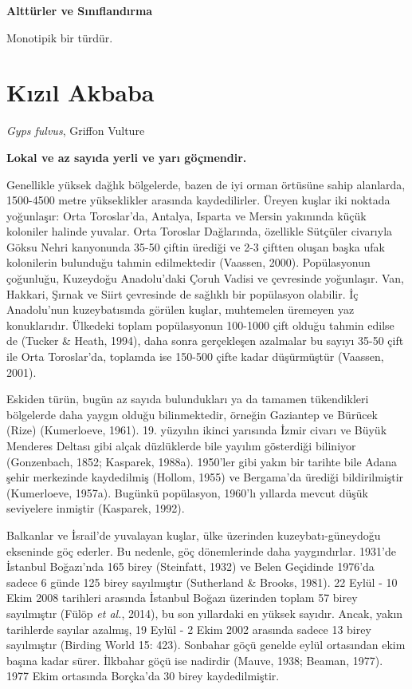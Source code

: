 \documentclass[
  a4paper,
  DIV=11,
  numbers=noendperiod]{scrreprt}
\begin{document}
\textbf{Alttürler ve Sınıflandırma}

Monotipik bir türdür.

\section{Kızıl Akbaba}\label{kux131zux131l-akbaba}

\emph{Gyps fulvus}, Griffon Vulture

\textbf{Lokal ve az sayıda yerli ve yarı göçmendir.}

Genellikle yüksek dağlık bölgelerde, bazen de iyi orman örtüsüne sahip
alanlarda, 1500-4500 metre yükseklikler arasında kaydedilirler. Üreyen
kuşlar iki noktada yoğunlaşır: Orta Toroslar'da, Antalya, Isparta ve
Mersin yakınında küçük koloniler halinde yuvalar. Orta Toroslar
Dağlarında, özellikle Sütçüler civarıyla Göksu Nehri kanyonunda 35-50
çiftin ürediği ve 2-3 çiftten oluşan başka ufak kolonilerin bulunduğu
tahmin edilmektedir (Vaassen, 2000). Popülasyonun çoğunluğu, Kuzeydoğu
Anadolu'daki Çoruh Vadisi ve çevresinde yoğunlaşır. Van, Hakkari, Şırnak
ve Siirt çevresinde de sağlıklı bir popülasyon olabilir. İç Anadolu'nun
kuzeybatısında görülen kuşlar, muhtemelen üremeyen yaz konuklarıdır.
Ülkedeki toplam popülasyonun 100-1000 çift olduğu tahmin edilse de
(Tucker \& Heath, 1994), daha sonra gerçekleşen azalmalar bu sayıyı
35-50 çift ile Orta Toroslar'da, toplamda ise 150-500 çifte kadar
düşürmüştür (Vaassen, 2001).

Eskiden türün, bugün az sayıda bulundukları ya da tamamen tükendikleri
bölgelerde daha yaygın olduğu bilinmektedir, örneğin Gaziantep ve
Bürücek (Rize) (Kumerloeve, 1961). 19. yüzyılın ikinci yarısında İzmir
civarı ve Büyük Menderes Deltası gibi alçak düzlüklerde bile yayılım
gösterdiği biliniyor (Gonzenbach, 1852; Kasparek, 1988a). 1950'ler gibi
yakın bir tarihte bile Adana şehir merkezinde kaydedilmiş (Hollom, 1955)
ve Bergama'da ürediği bildirilmiştir (Kumerloeve, 1957a). Bugünkü
popülasyon, 1960'lı yıllarda mevcut düşük seviyelere inmiştir (Kasparek,
1992).

Balkanlar ve İsrail'de yuvalayan kuşlar, ülke üzerinden
kuzeybatı-güneydoğu ekseninde göç ederler. Bu nedenle, göç dönemlerinde
daha yaygındırlar. 1931'de İstanbul Boğazı'nda 165 birey (Steinfatt,
1932) ve Belen Geçidinde 1976'da sadece 6 günde 125 birey sayılmıştır
(Sutherland \& Brooks, 1981). 22 Eylül - 10 Ekim 2008 tarihleri arasında
İstanbul Boğazı üzerinden toplam 57 birey sayılmıştır (Fülöp \emph{et
al.}, 2014), bu son yıllardaki en yüksek sayıdır. Ancak, yakın
tarihlerde sayılar azalmış, 19 Eylül - 2 Ekim 2002 arasında sadece 13
birey sayılmıştır (Birding World 15: 423). Sonbahar göçü genelde eylül
ortasından ekim başına kadar sürer. İlkbahar göçü ise nadirdir (Mauve,
1938; Beaman, 1977). 1977 Ekim ortasında Borçka'da 30 birey
kaydedilmiştir.
\end{document}

